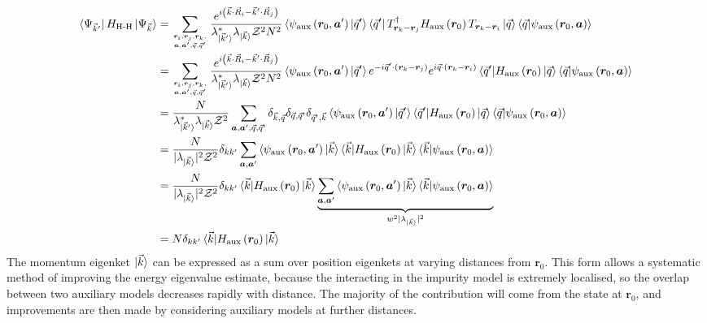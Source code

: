 \begin{equation}\begin{aligned}
	\bra{\Psi_{\vec k^\prime}}H_\text{H-H} \ket{\Psi_{\vec k}} &= \sum_{{\bm r}_i, {\bm r}_j, {\bm r}_k, \atop{{\bm a}, {\bm a}^\prime, \vec q, \vec q^\prime}}\frac{e^{i\left(\vec{k}\cdot\vec{R}_i - \vec{k}^\prime\cdot\vec{R}_j\right)}}{\lambda^*_{\ket{\vec k^\prime}} \lambda_{\ket{\vec k}} \mathcal{Z}^2 N^2} \braket{\psi_\text{aux}\left({\bm r_0}, {\bm a}^\prime\right)| \vec q^\prime}\bra{\vec q^\prime} T^\dagger_{{\bm r}_k - {\bm r}_j} H_\text{aux}\left({\bm r_0}\right) T_{{\bm r}_k - {\bm r}_i}  \ket{\vec q}\braket{\vec q | \psi_\text{aux}\left({\bm r_0}, {\bm a}\right)}\\
								   &= \sum_{{\bm r}_i, {\bm r}_j, {\bm r}_k, \atop{{\bm a}, {\bm a}^\prime, \vec q, \vec q^\prime}}\frac{e^{i\left(\vec{k}\cdot\vec{R}_i - \vec{k}^\prime\cdot\vec{R}_j\right)}}{\lambda^*_{\ket{\vec k^\prime}} \lambda_{\ket{\vec k}} \mathcal{Z}^2 N^2} \braket{\psi_\text{aux}\left({\bm r_0}, {\bm a}^\prime\right)| \vec q^\prime} e^{-i \vec q^\prime \cdot \left({\bm r}_k - {\bm r}_j\right) } e^{i \vec q \cdot \left({\bm r}_k - {\bm r}_i\right)} \braket{\vec q^\prime | H_\text{aux}\left({\bm r_0}\right) | \vec q}  \braket{\vec q | \psi_\text{aux}\left({\bm r_0}, {\bm a}\right)}\\
								   &= \frac{N}{\lambda^*_{\ket{\vec k^\prime}} \lambda_{\ket{\vec k}} \mathcal{Z}^2}\sum_{{\bm a}, {\bm a}^\prime, \vec q, \vec q^\prime} \delta_{\vec k, \vec q} \delta_{\vec q,\vec q^\prime} \delta_{\vec q^\prime,\vec k} \braket{\psi_\text{aux}\left({\bm r_0}, {\bm a}^\prime\right)| \vec q^\prime} \braket{\vec q^\prime | H_\text{aux}\left({\bm r_0}\right) | \vec q}  \braket{\vec q | \psi_\text{aux}\left({\bm r_0}, {\bm a}\right)}\\
								   &= \frac{N}{|\lambda_{\ket{\vec k}}|^2 \mathcal{Z}^2}\delta_{kk^\prime}\sum_{{\bm a}, {\bm a}^\prime} \braket{\psi_\text{aux}\left({\bm r_0}, {\bm a}^\prime\right)| \vec k} \braket{\vec k | H_\text{aux}\left({\bm r_0}\right) | \vec k}  \braket{\vec k | \psi_\text{aux}\left({\bm r_0}, {\bm a}\right)}\\
								   &= \frac{N}{|\lambda_{\ket{\vec k}}|^2 \mathcal{Z}^2}\delta_{kk^\prime}\braket{\vec k | H_\text{aux}\left({\bm r_0}\right) | \vec k} \underbrace{\sum_{{\bm a}, {\bm a}^\prime} \braket{\psi_\text{aux}\left({\bm r_0}, {\bm a}^\prime\right)| \vec k} \braket{\vec k | \psi_\text{aux}\left({\bm r_0}, {\bm a}\right)}}_{w^2 |\lambda_{\ket{\vec k}}|^2}\\
	&= N\delta_{kk^\prime}\braket{\vec k | H_\text{aux}\left({\bm r_0}\right) | \vec k}
\end{aligned}\end{equation}
The momentum eigenket \(\ket{\vec k}\) can be expressed as a sum over position eigenkets at varying distances from \({\bm r_0}\). This form allows a systematic method of improving the energy eigenvalue estimate, because the interacting in the impurity model is extremely localised, so the overlap between two auxiliary models decreases rapidly with distance. The majority of the contribution will come from the state at \({\bm r_0}\), and improvements are then made by considering auxiliary models at further distances. 

